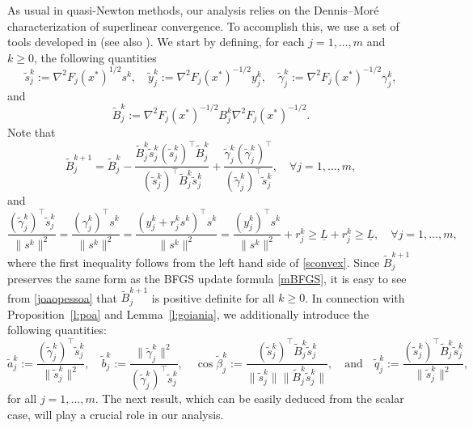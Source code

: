 \documentclass[11pt]{article}
\numberwithin{assumption}{section}
\newcommand{\ty}{\tilde{y}_j^k}
\newcommand{\ts}{\tilde{s}_j^k}
\newcommand{\tq}{\tilde{q}_j^k}
\newcommand{\ta}{\tilde{a}_j^k}
\newcommand{\tB}{\tilde{B}_j^k}
\newcommand{\tb}{\tilde{b}_j^k}
\newcommand{\tg}{\tilde{\gamma}_j^k}
\begin{document}
As usual in quasi-Newton methods, our analysis relies on the Dennis--Mor\'e \cite{DennisMore} characterization of superlinear convergence.
To accomplish this, we use a set of tools developed in \cite{Tool} (see also \cite{powell1976some}).
We start by defining, for each $j=1,\ldots,m$ and $k\geq 0$, the following quantities
\[\ts := \nabla^2F_j(x^{*})^{1/2}s^k, \quad \ty  := \nabla^2F_j(x^{*})^{-1/2} y_j^{k}, \quad \tg:= \nabla^2F_j(x^{*})^{-1/2} \gamma_j^k,\]
and
\[\tB := \nabla^2F_j(x^{*})^{-1/2} B_j^{k}\nabla^2F_j(x^{*})^{-1/2}.\]
Note that
\[\tilde{B}_j^{k+1} = \tB- \dfrac{\tB\ts(\ts)^\top\tB}{(\ts)^\top\tB\ts} + \dfrac{\tg(\tg)^\top}{(\tg)^\top\ts}, \quad \forall j=1,\ldots,m,\]
and
\begin{equation}\label{joaopessoa}
\dfrac{(\tg)^\top\ts}{\|s^k\|^2}=\dfrac{(\gamma_j^k)^\top s^k}{\|s^k\|^2}=\dfrac{(y_j^k+r_j^ks^k)^\top s^k}{\|s^k\|^2}=\dfrac{(y_j^k)^\top s^k}{\|s^k\|^2}+r_j^k\geq \underline{L}+r_j^k\geq \underline{L} , \quad \forall j=1,\ldots,m,
\end{equation}
  where the first inequality follows from the left hand side of \eqref{sconvex}.
  Since $\tilde{B}_j^{k+1}$ preserves the same form as the BFGS update formula \eqref{mBFGS}, it is easy to see from \eqref{joaopessoa}  that  $\tilde{B}_j^{k+1}$ is positive definite for all $k\geq 0$.
In connection with Proposition~\ref{l:poa} and Lemma~\ref{l:goiania}, we additionally introduce the following quantities:
\[\ta:= \dfrac{(\tg)^\top\ts}{\|\ts\|^2}, \quad \tb:= \dfrac{\|\tg\|^2}{(\tg)^\top\ts}, \quad \cos \tilde{\beta}_j^k  := \dfrac{(\ts)^\top\tB\ts}{\|\ts\|\|\tB \ts\|}, \quad \mbox{and} \quad \tq := \dfrac{(\ts)^\top\tB\ts}{\|\ts\|^2},\]
for all $j=1,\ldots,m$. The next result, which can be easily deduced from the scalar case, will play a crucial role in our analysis.
\end{document}

